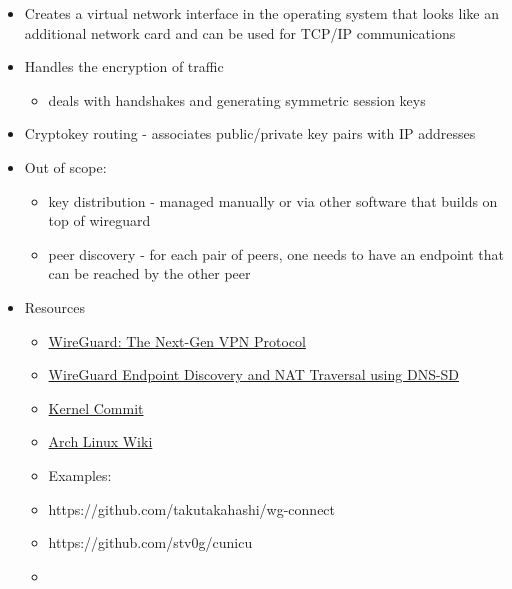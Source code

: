 \begin{itemize}
\tightlist
\item
  Creates a virtual network interface in the operating system that looks like an additional network card and can be used for TCP/IP communications
\item
  Handles the encryption of traffic

  \begin{itemize}
  \tightlist
  \item
    deals with handshakes and generating symmetric session keys
  \end{itemize}
\item
  Cryptokey routing - associates public/private key pairs with IP addresses
\item
  Out of scope:

  \begin{itemize}
  \tightlist
  \item
    key distribution - managed manually or via other software that builds on top of wireguard
  \item
    peer discovery - for each pair of peers, one needs to have an endpoint that can be reached by the other peer
  \end{itemize}
\item
  Resources

  \begin{itemize}
  \tightlist
  \item
    \href{https://blogs.keysight.com/blogs/tech/nwvs.entry.html/2022/09/22/wireguard_the_next-genvpnprotocol-OcEz.html}{WireGuard: The Next-Gen VPN Protocol}
  \item
    \href{https://www.jordanwhited.com/posts/wireguard-endpoint-discovery-nat-traversal/}{WireGuard Endpoint Discovery and NAT Traversal using DNS-SD}
  \item
    \href{https://git.kernel.org/pub/scm/linux/kernel/git/torvalds/linux.git/commit/?id=e7096c131e5161fa3b8e52a650d7719d2857adfd}{Kernel Commit}
  \item
    \href{https://wiki.archlinux.org/title/WireGuard}{Arch Linux Wiki}
  \item
    Examples:
  \item
    https://github.com/takutakahashi/wg-connect
  \item
    https://github.com/stv0g/cunicu
  \item
  \end{itemize}
\end{itemize}

